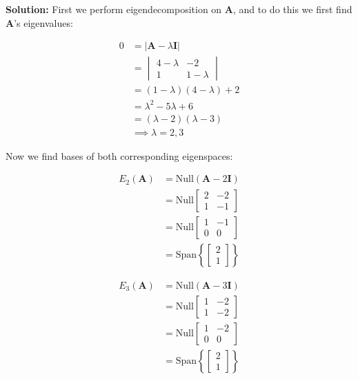 \documentclass{article}
\begin{document}
\noindent\textbf{Solution:} First we perform eigendecomposition on $\mathbf{A}$, and to do this we first find $\mathbf{A}$'s eigenvalues:

\begin{align*}
    0&=|\mathbf{A}-\lambda \mathbf{I}|\\
    &=\begin{vmatrix} 4-\lambda & -2 \\ 1 & 1-\lambda \end{vmatrix}\\
    &=(1-\lambda)(4-\lambda)+2\\
    &=\lambda^2-5\lambda+6\\
    &=(\lambda-2)(\lambda-3)\\
    &\implies \lambda=2,3
\end{align*}
\pagebreak

Now we find bases of both corresponding eigenspaces:

\begin{align*}
    E_2(\mathbf{A})&=\text{Null}(\mathbf{A}-2\mathbf{I})\tag{def. of eigenspace}\\
    &=\text{Null}\begin{bmatrix} 2 & -2 \\ 1 & -1 \end{bmatrix}\\
    &=\text{Null}\begin{bmatrix} 1 & -1 \\ 0 & 0 \end{bmatrix}\tag{rref}\\
    &=\text{Span}\left\{\begin{bmatrix} 2\\1\end{bmatrix}\right\}\tag{$x_1=x_2$}
\end{align*}

\begin{align*}
    E_3(\mathbf{A})&=\text{Null}(\mathbf{A}-3\mathbf{I})\tag{def. of eigenspace}\\
    &=\text{Null}\begin{bmatrix} 1 & -2 \\ 1 & -2 \end{bmatrix}\\
    &=\text{Null}\begin{bmatrix} 1 & -2 \\ 0 & 0 \end{bmatrix}\tag{rref}\\
    &=\text{Span}\left\{\begin{bmatrix} 2\\1\end{bmatrix}\right\}\tag{$x_1=2x_2$}
\end{align*}
\end{document}
